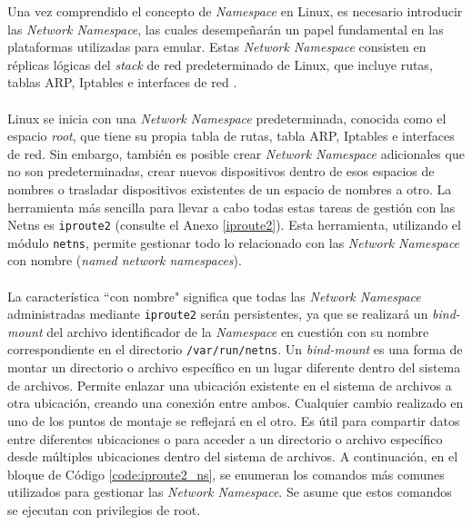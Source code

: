 Una vez comprendido el concepto de \textit{Namespace} en Linux, es necesario introducir las \textit{Network Namespace}, las cuales desempeñarán un papel fundamental en las plataformas utilizadas para emular. Estas \textit{Network Namespace} consisten en réplicas lógicas del \textit{stack} de red predeterminado de Linux, que incluye rutas, tablas ARP, Iptables e interfaces de red \cite{netns}.\\
\\
Linux se inicia con una \textit{Network Namespace} predeterminada, conocida como el espacio \textit{root}, que tiene su propia tabla de rutas, tabla ARP, Iptables e interfaces de red. Sin embargo, también es posible crear \textit{Network Namespace} adicionales que no son predeterminadas, crear nuevos dispositivos dentro de esos espacios de nombres o trasladar dispositivos existentes de un espacio de nombres a otro. La herramienta más sencilla para llevar a cabo todas estas tareas de gestión con las Netns es \texttt{iproute2} (consulte el Anexo \ref{iproute2}). Esta herramienta, utilizando el módulo \texttt{netns}, permite gestionar todo lo relacionado con las \textit{Network Namespace} con nombre (\textit{named network namespaces}). \\
\\
La característica ``con nombre" significa que todas las \textit{Network Namespace} administradas mediante \texttt{iproute2} serán persistentes, ya que se realizará un \textit{bind-mount} del archivo identificador de la \textit{Namespace} en cuestión con su nombre correspondiente en el directorio \texttt{/var/run/netns}. Un \textit{bind-mount} es una forma de montar un directorio o archivo específico en un lugar diferente dentro del sistema de archivos. Permite enlazar una ubicación existente en el sistema de archivos a otra ubicación, creando una conexión entre ambos. Cualquier cambio realizado en uno de los puntos de montaje se reflejará en el otro. Es útil para compartir datos entre diferentes ubicaciones o para acceder a un directorio o archivo específico desde múltiples ubicaciones dentro del sistema de archivos. A continuación, en el bloque de Código \ref{code:iproute2_ns}, se enumeran los comandos más comunes utilizados para gestionar las \textit{Network Namespace}. Se asume que estos comandos se ejecutan con privilegios de root.\\

